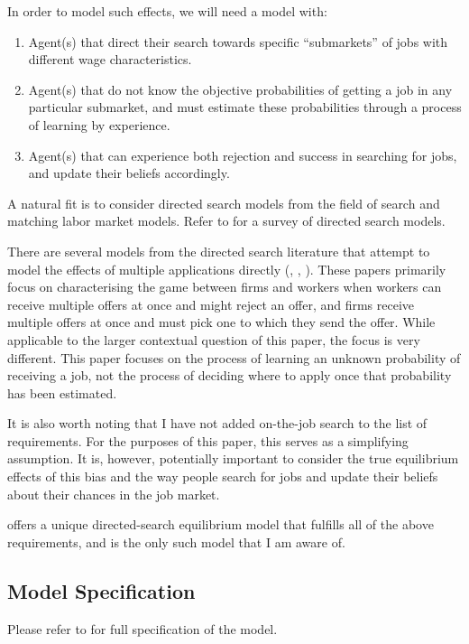 \documentclass[a4paper,12pt]{article}
\begin{document}
In order to model such effects, we will need a model with:
%
\begin{enumerate}
\item Agent(s) that direct their search towards specific ``submarkets'' of jobs with different wage characteristics.
\item Agent(s) that do not know the objective probabilities of getting a job in any particular submarket, and must estimate these probabilities through a process of learning by experience.
\item Agent(s) that can experience both rejection and success in searching for jobs, and update their beliefs accordingly.
\end{enumerate}
%
A natural fit is to consider directed search models from the field of search and matching labor market models. Refer to \cite{wright2017} for a survey of directed search models.

There are several models from the directed search literature that attempt to model the effects of multiple applications directly (\cite{albrecht2006}, \cite{galenianos2009}, \cite{wolthoff2017}). These papers primarily focus on characterising the game between firms and workers when workers can receive multiple offers at once and might reject an offer, and firms receive multiple offers at once and must pick one to which they send the offer. While applicable to the larger contextual question of this paper, the focus is very different. This paper focuses on the process of learning an unknown probability of receiving a job, not the process of deciding where to apply once that probability has been estimated.

It is also worth noting that I have not added on-the-job search to the list of requirements. For the purposes of this paper, this serves as a simplifying assumption. It is, however, potentially important to consider the true equilibrium effects of this bias and the way people search for jobs and update their beliefs about their chances in the job market.

\cite{gonzalez2010} offers a unique directed-search equilibrium model that fulfills all of the above requirements, and is the only such model that I am aware of.

\subsection{ Model Specification }

Please refer to \cite{gonzalez2010} for full specification of the model.
\end{document}
